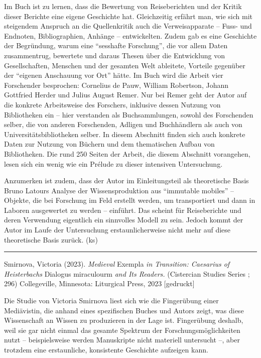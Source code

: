\documentclass[a4paper,
fontsize=11pt,
oneside,
numbers=noperiodatend,
parskip=half-,
bibliography=totoc,
final
]{scrartcl}
\begin{document}
Im Buch ist zu lernen, dass die Bewertung von Reiseberichten und der
Kritik dieser Berichte eine eigene Geschichte hat. Gleichzeitig erfährt
man, wie sich mit steigendem Anspruch an die Quellenkritik auch die
Verweisapparate -- Fuss- und Endnoten, Bibliographien, Anhänge --
entwickelten. Zudem gab es eine Geschichte der Begründung, warum eine
\enquote{sesshafte Forschung}, die vor allem Daten zusammentrug,
bewertete und daraus Thesen über die Entwicklung von Gesellschaften,
Menschen und der gesamten Welt ableitete, Vorteile gegenüber der
\enquote{eigenen Anschauung vor Ort} hätte. Im Buch wird die Arbeit vier
Forschender besprochen: Cornelius de Pauw, William Robertson, Johann
Gottfried Herder und Julius August Remer. Nur bei Remer geht der Autor
auf die konkrete Arbeitsweise des Forschers, inklusive dessen Nutzung
von Bibliotheken ein -- hier verstanden als Buchsammlungen, sowohl des
Forschenden selber, die von anderen Forschenden, Adligen und
Buchhändlern als auch von Universitätsbibliotheken selber. In diesem
Abschnitt finden sich auch konkrete Daten zur Nutzung von Büchern und
dem thematischen Aufbau von Bibliotheken. Die rund 250 Seiten der
Arbeit, die diesem Abschnitt vorangehen, lesen sich ein wenig wie ein
Prélude zu dieser intensiven Untersuchung.

Anzumerken ist zudem, dass der Autor im Einleitungsteil als theoretische
Basis Bruno Latours Analyse der Wissensproduktion aus \enquote{immutable
mobiles} -- Objekte, die bei Forschung im Feld erstellt werden, um
transportiert und dann in Laboren ausgewertet zu werden -- einführt. Das
scheint für Reiseberichte und deren Verwendung eigentlich ein sinnvolles
Modell zu sein. Jedoch kommt der Autor im Laufe der Untersuchung
erstaunlicherweise nicht mehr auf diese theoretische Basis zurück. (ks)

\begin{center}\rule{0.5\linewidth}{0.5pt}\end{center}

Smirnova, Victoria (2023). \emph{Medieval} Exempla \emph{in Transition:
Caesarius of Heisterbachs} Dialogus miraculourm \emph{and Its Readers.}
(Cistercian Studies Series ; 296) Collegeville, Minnesota: Liturgical
Press, 2023 {[}gedruckt{]}

Die Studie von Victoria Smirnova liest sich wie die Fingerübung einer
Mediävistin, die anhand eines spezifischen Buches und Autors zeigt, was
diese Wissenschaft an Wissen zu produzieren in der Lage ist. Fingerübung
deshalb, weil sie gar nicht einmal das gesamte Spektrum der
Forschungsmöglichkeiten nutzt -- beispielsweise werden Manuskripte nicht
materiell untersucht --, aber trotzdem eine erstaunliche, konsistente
Geschichte aufzeigen kann.
\end{document}
